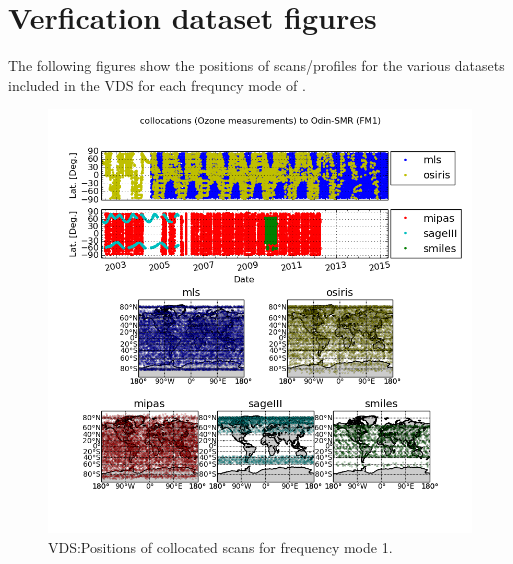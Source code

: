 
\chapter{Verfication dataset figures}

The following figures show the positions of scans/profiles
for the various datasets included in the VDS 
for each frequncy mode of \smr.


\begin{figure}[t]
\centering
\includegraphics[width=17cm]{test_collocation_fm1.png}
\caption{VDS:Positions of collocated scans for frequency mode 1.}
\label{fig:vdsfm1b}
\end{figure}


